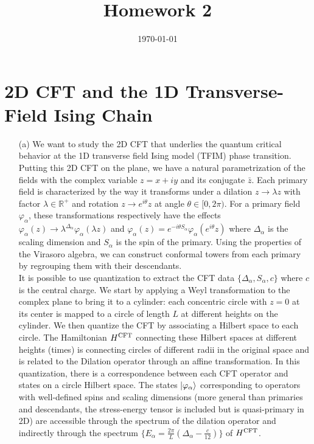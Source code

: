 \documentclass[10pt, a4paper]{article}
\title{Homework 2} %
\author{\PA} %
\date{\today} %
\begin{document}
\maketitlepage

\maketableofcontents


\footnotesize{

\section{2D CFT and the 1D Transverse-Field Ising Chain}

\begin{enumerate}
  \item[(a)] We want to study the 2D CFT that underlies the quantum critical behavior at the 1D transverse field Ising model (TFIM) phase transition. Putting this 2D CFT on the plane, we have a natural parametrization of the fields with the complex variable $z = x+iy$ and its conjugate $\bar{z}$. Each primary field is characterized by the way it transforms under a dilation $z \to \lambda z$ with factor $\lambda \in \mathbb{R}^+$ and rotation $z \to e^{i \theta} z$ at angle $\theta \in [0, 2\pi)$. For a primary field $\varphi_\alpha$, these transformations respectively have the effects $\varphi_\alpha(z) \to \lambda^{\Delta_\alpha}\varphi_{\alpha}(\lambda z)$ and $\varphi_{\alpha}(z) = e^{- i \theta S_\alpha} \varphi_{\alpha}(e^{i \theta} z)$ where $\Delta_\alpha$ is the scaling dimension and $S_\alpha$ is the spin of the primary. Using the properties of the Virasoro algebra, we can construct conformal towers from each primary by regrouping them with their descendants. \\
  
  It is possible to use quantization to extract the CFT data $\{\Delta_\alpha, S_\alpha, c\}$ where $c$ is the central charge. We start by applying a Weyl transformation to the complex plane to bring it to a cylinder: each concentric circle with $z=0$ at its center is mapped to a circle of length $L$ at different heights on the cylinder. We then quantize the CFT by associating a Hilbert space to each circle. The Hamiltonian $H^{\rm CFT}$ connecting these Hilbert spaces at different heights (times) is connecting circles of different radii in the original space and is related to the Dilation operator through an affine transformation. In this quantization, there is a correspondence between each CFT operator and states on a circle Hilbert space. The states $\ket{\varphi_\alpha}$ corresponding to operators with well-defined spins and scaling dimensions (more general than primaries and descendants, the stress-energy tensor is included but is quasi-primary in 2D) are accessible through the spectrum of the dilation operator and indirectly through the spectrum $\{E_{\alpha} = \frac{2\pi}{L} (\Delta_\alpha - \frac{c}{12})\}$ of $H^{\rm CFT}$. \\


\end{enumerate}}
\end{document}
